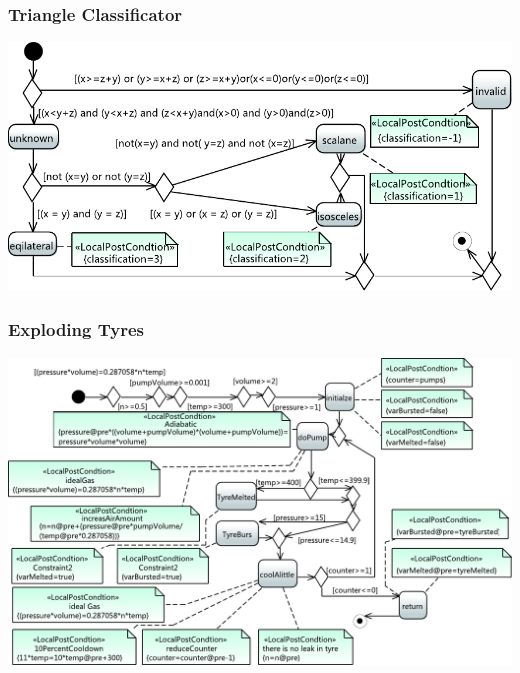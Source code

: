 \documentclass{beamer}
\begin{document}
\begin{frame}
\frametitle{Triangle Classificator}
% 
\includegraphics[width=\textwidth]{./pics/TriangleClasivicator.pdf}
\end{frame}
\begin{frame}
\frametitle{Exploding Tyres}
% 
\includegraphics[width=\textwidth]{./pics/TyrePump.pdf}
\end{frame}
\end{document}
